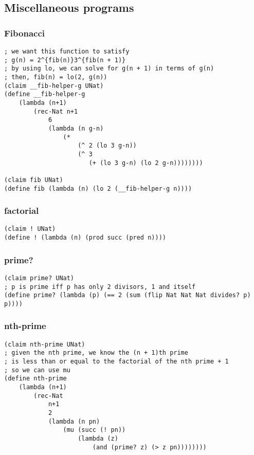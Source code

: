 \subsection{Miscellaneous programs}

\subsubsection{Fibonacci} \label{code:Fibonacci}
\begin{verbatim}
; we want this function to satisfy
; g(n) = 2^{fib(n)}3^{fib(n + 1)}
; by using lo, we can solve for g(n + 1) in terms of g(n)
; then, fib(n) = lo(2, g(n))
(claim __fib-helper-g UNat)
(define __fib-helper-g
    (lambda (n+1)
        (rec-Nat n+1
            6
            (lambda (n g-n) 
                (*
                    (^ 2 (lo 3 g-n))
                    (^ 3
                       (+ (lo 3 g-n) (lo 2 g-n))))))))

(claim fib UNat)
(define fib (lambda (n) (lo 2 (__fib-helper-g n))))
\end{verbatim}

\subsubsection{factorial} \label{code:factorial}
\begin{verbatim}
(claim ! UNat)
(define ! (lambda (n) (prod succ (pred n))))
\end{verbatim}

\subsubsection{prime?} \label{code:prime?}
\begin{verbatim}
(claim prime? UNat)
; p is prime iff p has only 2 divisors, 1 and itself
(define prime? (lambda (p) (== 2 (sum (flip Nat Nat Nat divides? p) p))))
\end{verbatim}

\subsubsection{nth-prime} \label{code:nth-prime}
\begin{verbatim}
(claim nth-prime UNat)
; given the nth prime, we know the (n + 1)th prime
; is less than or equal to the factorial of the nth prime + 1
; so we can use mu
(define nth-prime
    (lambda (n+1)
        (rec-Nat
            n+1
            2
            (lambda (n pn) 
                (mu (succ (! pn)) 
                    (lambda (z) 
                        (and (prime? z) (> z pn))))))))
\end{verbatim}

